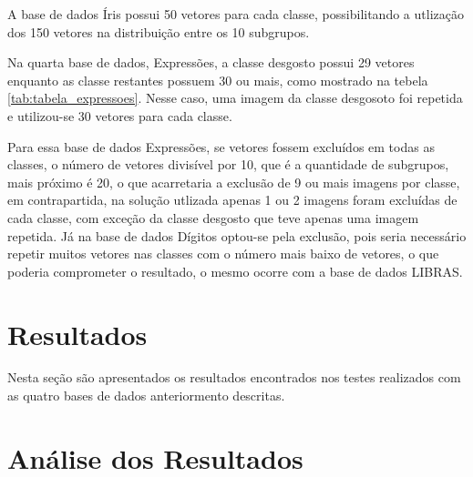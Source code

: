 A base de dados Íris possui 50 vetores para cada classe, possibilitando a utlização dos 150 vetores na distribuição entre os 10 subgrupos.

Na quarta base de dados, Expressões, a classe desgosto possui 29 vetores enquanto as classe restantes possuem 30 ou mais, como mostrado na tebela \ref{tab:tabela_expressoes}. Nesse caso, uma imagem da classe desgosoto foi repetida e utilizou-se 30 vetores para cada classe. 

Para essa base de dados Expressões, se vetores fossem excluídos em todas as classes, o número de vetores divisível por 10, que é a quantidade de subgrupos, mais próximo é 20, o que acarretaria a exclusão de 9 ou mais imagens por classe, em contrapartida, na solução utlizada apenas 1 ou 2 imagens foram excluídas de cada classe, com exceção da classe desgosto que teve apenas uma imagem repetida. Já na base de dados Dígitos optou-se pela exclusão, pois seria necessário repetir muitos vetores nas classes com o número mais baixo de vetores, o que poderia comprometer o resultado, o mesmo ocorre com a base de dados LIBRAS.

\section{Resultados}
Nesta seção são apresentados os resultados encontrados nos testes realizados com as quatro bases de dados anteriormento descritas. 

\section{Análise dos Resultados}
